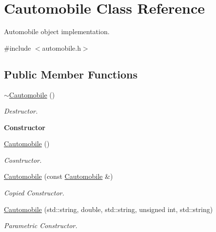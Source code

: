 \hypertarget{class_cautomobile}{}\section{Cautomobile Class Reference}
\label{class_cautomobile}


Automobile object implementation.  




{\ttfamily \#include $<$automobile.\+h$>$}

\subsection*{Public Member Functions}
\begin{DoxyCompactItemize}
\item 
\hyperlink{class_cautomobile_aa3a2ca53356fd2f599afb1dffbdd1473}{$\sim$\+Cautomobile} ()\hypertarget{class_cautomobile_aa3a2ca53356fd2f599afb1dffbdd1473}{}\label{class_cautomobile_aa3a2ca53356fd2f599afb1dffbdd1473}

\begin{DoxyCompactList}\small\item\em Destructor. \end{DoxyCompactList}\end{DoxyCompactItemize}
\begin{Indent}{\bf Constructor}\par
\begin{DoxyCompactItemize}
\item 
\hyperlink{class_cautomobile_abd847a15c21f065b4b6fa00fec9a553a}{Cautomobile} ()
\begin{DoxyCompactList}\small\item\em Cosntructor. \end{DoxyCompactList}\item 
\hyperlink{class_cautomobile_a3dff087e063cba889005398eada539fd}{Cautomobile} (const \hyperlink{class_cautomobile}{Cautomobile} \&)
\begin{DoxyCompactList}\small\item\em Copied Constructor. \end{DoxyCompactList}\item 
\hyperlink{class_cautomobile_a935f9292ea591bf928a1f54914b7057c}{Cautomobile} (std\+::string, double, std\+::string, unsigned int, std\+::string)
\begin{DoxyCompactList}\small\item\em Parametric Constructor. \end{DoxyCompactList}\end{DoxyCompactItemize}
\end{Indent}
